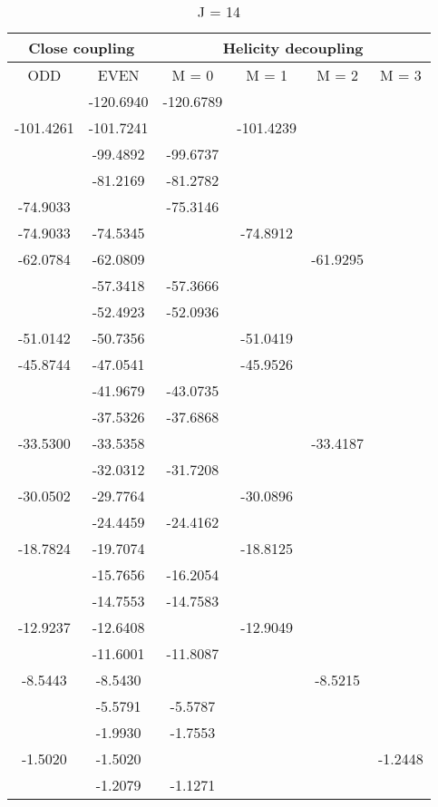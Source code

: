 \documentclass[12pt]{article}
\begin{document}
\begin{table}[H]
\begin{center}
\begin{tabular}{cccccc}
\toprule[1.5pt]
\multicolumn{2}{c}{Close coupling} & \multicolumn{4}{c}{Helicity decoupling} \\
\toprule[1.5pt]
ODD & EVEN & M = 0 & M = 1 & M = 2 & M = 3\\ 
\midrule
& -120.6940 & -120.6789 & & & \\ 
-101.4261 & -101.7241 & & -101.4239 & & \\ 
& -99.4892 & -99.6737 & & & \\ 
& -81.2169 & -81.2782 & & & \\ 
-74.9033 & & -75.3146 & & & \\ 
-74.9033 & -74.5345 & & -74.8912 & & \\ 
-62.0784 & -62.0809 & & & -61.9295 & \\ 
& -57.3418 & -57.3666 & & & \\ 
& -52.4923 & -52.0936 & & & \\ 
-51.0142 & -50.7356 & & -51.0419 & & \\ 
-45.8744 & -47.0541 & & -45.9526 & & \\ 
& -41.9679 & -43.0735 & & & \\ 
& -37.5326 & -37.6868 & & & \\ 
-33.5300 & -33.5358 & & & -33.4187 & \\ 
& -32.0312 & -31.7208 & & & \\ 
-30.0502 & -29.7764 & & -30.0896 & & \\ 
& -24.4459 & -24.4162 & & & \\ 
-18.7824 & -19.7074 & & -18.8125 & & \\ 
& -15.7656 & -16.2054 & & & \\ 
& -14.7553 & -14.7583 & & & \\ 
-12.9237 & -12.6408 & & -12.9049 & & \\ 
& -11.6001 & -11.8087 & & & \\ 
-8.5443 & -8.5430 & & & -8.5215 & \\ 
& -5.5791 & -5.5787 & & & \\ 
& -1.9930 & -1.7553 & & & \\ 
-1.5020 & -1.5020 & & & & -1.2448\\ 
& -1.2079 & -1.1271 & & & \\ 
\bottomrule
\end{tabular}
\caption{J = 14} 
\end{center}
\end{table}
\end{document}
